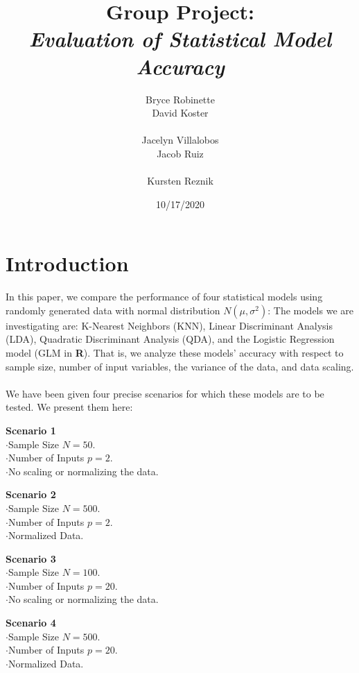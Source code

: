 \documentclass[11pt, oneside]{article}
\title{Group Project:\\
\emph{Evaluation of Statistical Model Accuracy}
}
\author{\hspace{0.0cm}\parbox[t][2.5cm][t]{4cm}{
	Bryce Robinette\\
	David Koster\\
}
\parbox[t][2.5cm][t]{4cm}{
	Jacelyn Villalobos\\
	Jacob Ruiz\\
}
Kursten Reznik 
}
\date{10/17/2020}
\begin{document}
\maketitle

\pagebreak

\tableofcontents

\pagebreak


\section{Introduction}
In this paper, we compare the performance of four statistical models using randomly generated data with normal distribution $N(\mu, \sigma^2)$: The models we are investigating are: K-Nearest Neighbors (KNN), Linear Discriminant Analysis (LDA), Quadratic Discriminant Analysis (QDA), and the Logistic Regression model (GLM in \textbf\textsf{R}). That is, we analyze these models' accuracy with respect to sample size, number of input variables, the variance of the data, and data scaling.\\
\\
We have been given four precise scenarios for which these models are to be tested. We present them here:\\


\hspace{1.5cm}\parbox[t][2.5cm][t]{8cm}{
	\textbf{Scenario 1}\\
	$\cdot$Sample Size $N = 50.$\\
	$\cdot$Number of Inputs $p = 2$.\\
	$\cdot$No scaling or normalizing the data.
}
\parbox[t][2.5cm][t]{8cm}{
	\textbf{Scenario 2}\\
	$\cdot$Sample Size $N = 500.$\\
	$\cdot$Number of Inputs $p = 2$.\\
	$\cdot$Normalized Data.
}

\hspace{1.5cm}\parbox[t][2.5cm][t]{8cm}{
	\textbf{Scenario 3}\\
	$\cdot$Sample Size $N = 100.$\\
	$\cdot$Number of Inputs $p = 20$.\\
	$\cdot$No scaling or normalizing the data.
}
\parbox[t][2.5cm][t]{8cm}{
	\textbf{Scenario 4}\\
	$\cdot$Sample Size $N = 500.$\\
	$\cdot$Number of Inputs $p = 20$.\\
	$\cdot$Normalized Data.
}
\end{document}

